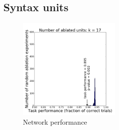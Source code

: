 \subsection{Syntax units}

\begin{figure}[b]
    \centering
    \includegraphics[height=5cm]{Figures/null_distribution_ablation_experiment_k_17.png}
    \caption{Network performance}
    \label{fig:ablation-syntax}
\end{figure}

